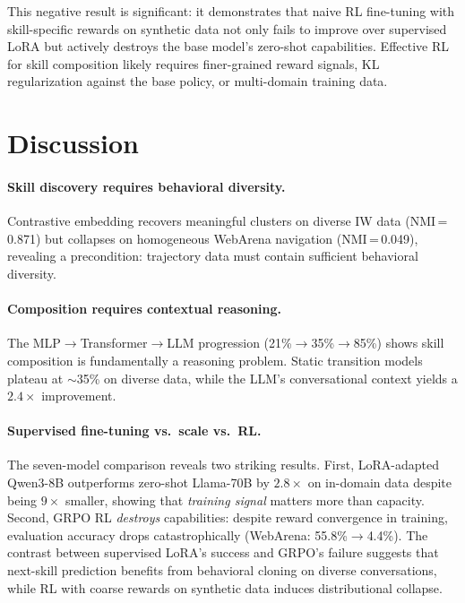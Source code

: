 \documentclass{article}
\begin{document}
This negative result is significant: it demonstrates that naive RL fine-tuning with skill-specific rewards on synthetic data not only fails to improve over supervised LoRA but actively destroys the base model's zero-shot capabilities. Effective RL for skill composition likely requires finer-grained reward signals, KL regularization against the base policy, or multi-domain training data.

\section{Discussion}
\label{sec:discussion}

\paragraph{Skill discovery requires behavioral diversity.} Contrastive embedding recovers meaningful clusters on diverse IW data (NMI\,=\,0.871) but collapses on homogeneous WebArena navigation (NMI\,=\,0.049), revealing a precondition: trajectory data must contain sufficient behavioral diversity.

\paragraph{Composition requires contextual reasoning.} The MLP$\to$Transformer$\to$LLM progression (21\%$\to$35\%$\to$85\%) shows skill composition is fundamentally a reasoning problem. Static transition models plateau at $\sim$35\% on diverse data, while the LLM's conversational context yields a $2.4\times$ improvement.

\paragraph{Supervised fine-tuning vs.\ scale vs.\ RL.} The seven-model comparison reveals two striking results. First, LoRA-adapted Qwen3-8B outperforms zero-shot Llama-70B by $2.8\times$ on in-domain data despite being $9\times$ smaller, showing that \emph{training signal} matters more than capacity. Second, GRPO RL \emph{destroys} capabilities: despite reward convergence in training, evaluation accuracy drops catastrophically (WebArena: 55.8\%$\to$4.4\%). The contrast between supervised LoRA's success and GRPO's failure suggests that next-skill prediction benefits from behavioral cloning on diverse conversations, while RL with coarse rewards on synthetic data induces distributional collapse.
\end{document}
